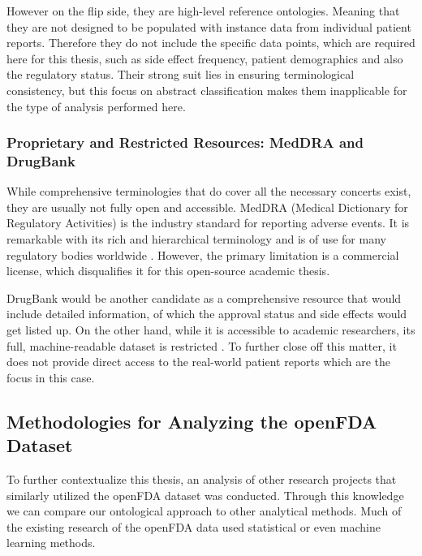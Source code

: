 However on the flip side, they are high-level reference ontologies. Meaning that they are not designed to be populated with instance data from individual patient reports. Therefore they do not include the specific data points, which are required here for this thesis, such as side effect frequency, patient demographics and also the regulatory status. Their strong suit lies in ensuring terminological consistency, but this focus on abstract classification makes them inapplicable for the type of analysis performed here. 
\subsubsection*{Proprietary and Restricted Resources: MedDRA and DrugBank}
While comprehensive terminologies that do cover all the necessary concerts exist, they are usually not fully open and accessible. MedDRA (Medical Dictionary for Regulatory Activities) is the industry standard for reporting adverse events. It is remarkable with its rich and hierarchical terminology and is of use for many regulatory bodies worldwide \cite{MedDRA2025}. However, the primary limitation is a commercial license, which disqualifies it for this open-source academic thesis.

DrugBank would be another candidate as a comprehensive resource that would include detailed information, of which the approval status and side effects would get listed up. On the other hand, while it is accessible to academic researchers, its full, machine-readable dataset is restricted \cite{DrugBankWebsite}. To further close off this matter, it does not provide direct access to the real-world patient reports which are the focus in this case. 
\subsection{Methodologies for Analyzing the openFDA Dataset }
To further contextualize this thesis, an analysis of other research projects that similarly utilized the openFDA dataset was conducted. Through this knowledge we can compare our ontological approach to other analytical methods. Much of the existing research of the openFDA data used statistical or even machine learning methods. 

